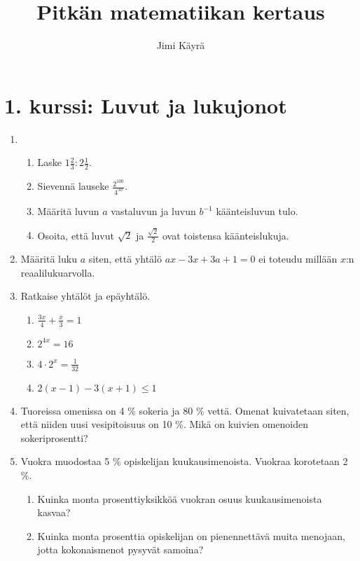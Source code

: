 \documentclass[12pt,fleqn]{article}
\date{}
\title{\textbf{Pitkän matematiikan kertaus}}
\author{Jimi Käyrä}
\begin{document}
\begin{titlepage}
\maketitle
\thispagestyle{empty}
\end{titlepage}

\section*{1. kurssi: Luvut ja lukujonot}
\begin{enumerate}[label=\textbf{\arabic*.}]
\item 
\begin{enumerate}[label=\textbf{\alph*)}]
\item Laske \(\displaystyle 1\frac{2}{3}:2\frac{1}{2}\).
\item Sievennä lauseke \(\displaystyle \frac{2^{100}}{4^{50}}\).
\item Määritä luvun \(a\) vastaluvun ja luvun \(b^{-1}\) käänteisluvun tulo.
\item Osoita, että luvut \(\sqrt{2}\) ja \(\displaystyle \frac{\sqrt{2}}{2}\) ovat toistensa käänteislukuja.
\end{enumerate}


\item Määritä luku \(a\) siten, että yhtälö \(ax - 3x + 3a + 1 = 0\) ei toteudu millään \(x\):n reaalilukuarvolla.

\item Ratkaise yhtälöt ja epäyhtälö.
\begin{enumerate}[label=\textbf{\alph*)}]
\item \(\displaystyle \frac{3x}{4}+\frac{x}{3}=1\)
\item \(2^{4x}=16\)
\item \(\displaystyle 4\cdot 2^x=\frac{1}{32}\)
\item \(2\left(x-1\right)-3\left(x+1\right)\leq 1\)
\end{enumerate}

\item Tuoreissa omenissa on 4 \% sokeria ja 80 \% vettä. Omenat kuivatetaan siten, että niiden uusi vesipitoisuus on 10 \%. Mikä on kuivien omenoiden sokeriprosentti?

\item Vuokra muodostaa 5 \% opiskelijan kuukausimenoista. Vuokraa korotetaan 2 \%.
\begin{enumerate}[label=\textbf{\alph*)}]
\item Kuinka monta prosenttiyksikköä vuokran osuus kuukausimenoista kasvaa?
\item Kuinka monta prosenttia opiskelijan on pienennettävä muita menojaan, jotta kokonaismenot pysyvät samoina?
\end{enumerate}


\end{enumerate}
\end{document}
